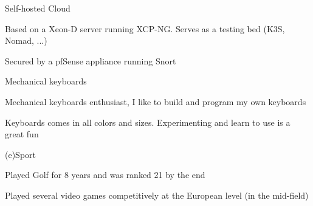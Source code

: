 

\begin{cventries}

  \cventry
    {Self-hosted Cloud} %
    {} %
    {} %
    {} %
    {
      \begin{cvitems} %
        \item {Based on a Xeon-D server running XCP-NG. Serves as a testing bed (K3S, Nomad, ...)}
        \item {Secured by a pfSense appliance running Snort}
      \end{cvitems}
    }

  \cventry
    {Mechanical keyboards} %
    {} %
    {} %
    {} %
    {
      \begin{cvitems} %
        \item {Mechanical keyboards enthusiast, I like to build and program my own keyboards}
        \item {Keyboards comes in all colors and sizes. Experimenting and learn to use is a great fun}
      \end{cvitems}
    }

  \cventry
    {(e)Sport} %
    {} %
    {} %
    {} %
    {
      \begin{cvitems} %
        \item {Played Golf for 8 years and was ranked 21 by the end}
        \item {Played several video games competitively at the European level (in the mid-field)}
      \end{cvitems}
    }

\end{cventries}
